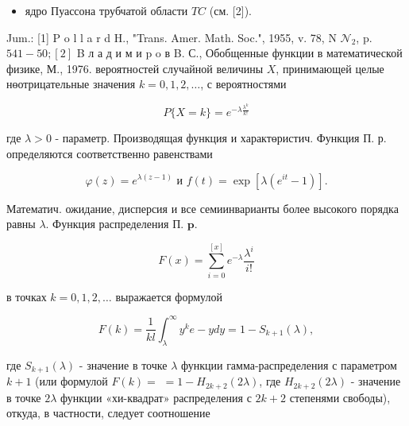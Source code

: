 \documentclass[10pt]{article}
\begin{document}
\begin{itemize}

  \item ядро Пуассона трубчатой области $T C$ (см. [2]).

\end{itemize}



Jum.: [1] P o l l a r d H., "Trans. Amer. Math. Soc.", 1955, v. 78, N $\mathcal{N}_{2}$, p. $541-50 ;[2]$ B л а д и м и p o в B. С., Обобщенные функции в математической физике, М., 1976. вероятностей случайной величины $X$, принимающей целые нөотрицательные значения $k=0,1,2, \ldots$, с вероятностями



\[

P\{X=k\}=e^{-\lambda \frac{\lambda^{k}}{k !}}

\]



где $\lambda>0$ - параметр. Производящая функция и характөристич. Функция П. р. определяются соответственно равенствами



\[

\varphi(z)=e^{\lambda(z-1)} \text { и } f(t)=\exp \left[\lambda\left(e^{i t}-1\right)\right] .

\]



Математич. ожидание, дисперсия и все семиинварианты более высокого порядка равны $\lambda$. Функция распределения П. $\mathbf{p}$.



\[

F(x)=\sum_{i=0}^{[x]} e^{-\lambda} \frac{\lambda^{i}}{i !}

\]



в точках $k=0,1,2, \ldots$ выражается формулой



\[

F(k)=\frac{1}{k l} \int_{\lambda}^{\infty} y^{k} e-y d y=1-S_{k+1}(\lambda),

\]



где $S_{k+1}(\lambda)$ - значение в точке $\lambda$ функции гамма-распределения с параметром $k+1$ (или формулой $F(k)=$ $=1-H_{2 k+2}(2 \lambda)$, где $H_{2 k+2}(2 \lambda)$ - значение в точке $2 \lambda$ функции «хи-квадрат» распределения с $2 k+2$ степенями свободы), откуда, в частности, следует соотношение
\end{document}
